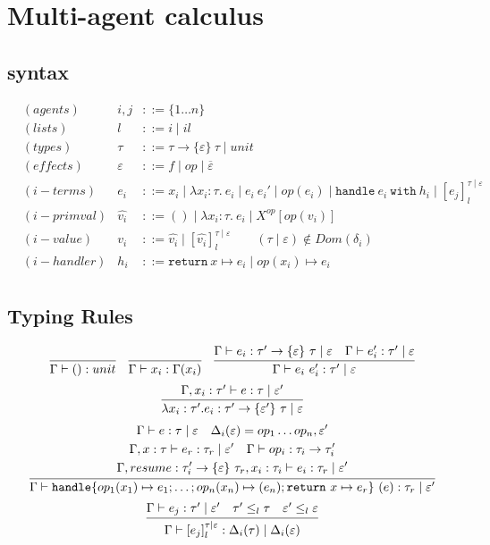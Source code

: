 \documentclass{article}
\begin{document}
\begin{verbatim}

\end{verbatim}

\newpage
\section{Multi-agent calculus}
\subsection{syntax}
\begin{align*}
&(agents) &i, j &::= \{1 \dots n\}\\
&(lists) & l &::= i \mid il\\
&(types) &\tau &::= \tau \rightarrow \{\varepsilon\}\ \tau \mid unit\\
&(effects) &\varepsilon &::= f \mid op \mid \overline{\varepsilon}\\ 
&(i-terms)  &e_i &::= x_i \mid \lambda x_i :\tau.\ e_i \mid e_i\ e_i'\mid op(e_i) \mid \texttt{handle}\ e_i\ \texttt{with}\ h_i \mid [e_j]^{\tau \mid \varepsilon}_l\\
&(i-primval) &\hat{v_i} &::= () \mid \lambda x_i :\tau.\ e_i  \mid X^{op}[op(v_i)]\\
&(i-value) &v_i &::= \hat{v_i} \mid [\hat{v_i}]^{\tau \mid \varepsilon}_l \quad\quad (\tau \mid \varepsilon) \not\in Dom(\delta_i)\\
&(i-handler) &h_i &::= \texttt{return}\ x \mapsto e_i \mid op(x_i) \mapsto e_i\\
\end{align*}

\subsection{Typing Rules}
$$\infer{\Gamma  \vdash () : unit}{} \quad \infer{\Gamma \vdash x_i : \Gamma (x_i)}{} \quad 
\infer{\Gamma \vdash e_i\ e_i' : \tau' \mid \varepsilon}{\Gamma \vdash e_i: \tau' \rightarrow \{\varepsilon\}\ \tau \mid \varepsilon & \Gamma \vdash e_i' : \tau' \mid \varepsilon}$$
$$ \infer{\lambda x_i : \tau'. e_i : \tau' \rightarrow \{\varepsilon'\}\ \tau \mid \varepsilon }{\Gamma, x_i:\tau' \vdash e:\tau  \mid \varepsilon'} $$
$$\infer{\Gamma \vdash \texttt{handle} \{op_1(x_1) \mapsto e_1; \dots; op_n(x_n)\mapsto (e_n); \texttt{return}\ x \mapsto e_r\}\ (e) : \tau_r \mid \varepsilon'}
{\begin{gathered} 
\Gamma \vdash e : \tau \mid \varepsilon  \quad \Delta_i(\varepsilon) = op_1  \dots  op_n, \varepsilon'\\
\Gamma, x:\tau \vdash e_r : \tau_r \mid \varepsilon' \quad \Gamma \vdash op_i : \tau_i \rightarrow \tau_i' \\
\Gamma, resume: \tau_i' \rightarrow \{\varepsilon\}\ \tau_r, x_i : \tau_i \vdash e_i : \tau_r \mid \varepsilon'
\end{gathered}
} 
$$
$$\infer{\Gamma \vdash [e_j]^{\tau \mid \varepsilon}_l: \Delta_i(\tau) \mid \Delta_i(\varepsilon)}{\Gamma \vdash e_j:\tau' \mid \varepsilon' \quad \tau' \leq_l \tau \quad \varepsilon' \leq_l \varepsilon}$$
\pagebreak
\end{document}
